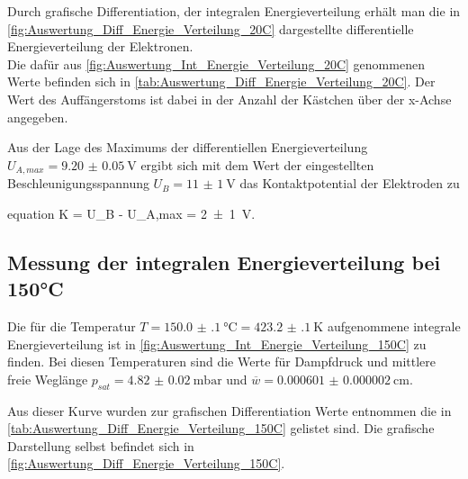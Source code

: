 	
	Durch grafische Differentiation, der integralen Energieverteilung erhält man die in
	\cref{fig:Auswertung_Diff_Energie_Verteilung_20C} dargestellte differentielle Energieverteilung
	der Elektronen. \\
	
	\noindent
	Die dafür aus \cref{fig:Auswertung_Int_Energie_Verteilung_20C} genommenen Werte
	befinden sich in \cref{tab:Auswertung_Diff_Energie_Verteilung_20C}. Der Wert des Auffängerstoms
	ist dabei in der Anzahl der Kästchen über der x-Achse angegeben. 
	
	
	
	
	Aus der Lage des Maximums der differentiellen Energieverteilung $U_{A,max} = \SI{9.20(5)}{\volt}$ 
	ergibt sich mit dem Wert der eingestellten Beschleunigungsspannung $U_{B} = \SI{11(1)}{\volt}$ das
	Kontaktpotential der Elektroden zu 
	\begin{empheq}{equation}
			K = U_{B} - U_{A,max} = \SI{2(1)}{\volt}.  
		    \label{val:Auswertung_K_1}
	\end{empheq}
	
			
\subsection{Messung der integralen Energieverteilung bei 150°C}
	
	Die für die Temperatur $T =\SI{150.0(1)}{\degreeCelsius} = \SI{423.2(1)}{\kelvin}$
	aufgenommene integrale Energieverteilung ist in \cref{fig:Auswertung_Int_Energie_Verteilung_150C}
	zu finden. Bei diesen Temperaturen sind die Werte für Dampfdruck und mittlere freie Weglänge
	$p_{sat} = \SI{4.82(2)}{\milli\bar}$ und $\overline{w} = \SI{0.000601(2)}{\cm}$. 
	
	
	Aus dieser Kurve wurden zur grafischen Differentiation Werte entnommen die in \cref{tab:Auswertung_Diff_Energie_Verteilung_150C} gelistet sind. Die grafische
	Darstellung selbst befindet sich in \cref{fig:Auswertung_Diff_Energie_Verteilung_150C}.
	
